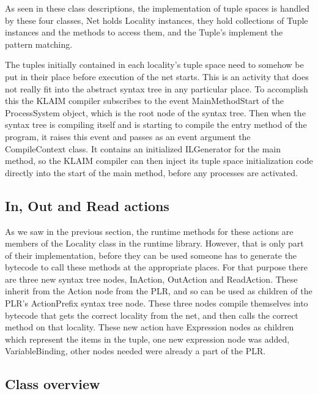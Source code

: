	As seen in these class descriptions, the implementation of tuple spaces is 
	handled by these four classes, \textsf{Net} holds \textsf{Locality} 
	instances, they hold collections of \textsf{Tuple} instances and the methods 
	to access them, and the \textsf{Tuple}'s implement the pattern matching.
	
	The tuples initially contained in each locality's tuple space need to 
	somehow be put in their place before execution of the net starts. This is an 
	activity that does not really fit into the abstract syntax tree in any 
	particular place. To accomplish this the KLAIM compiler subscribes to the 
	event \textsf{MainMethodStart} of the \textsf{ProcessSystem} object, which 
	is the root node of the syntax tree. Then when the syntax tree is compiling 
	itself and is starting to compile the entry method of the program, it raises 
	this event and passes as an event argument the \textsf{CompileContext} 
	class. It contains an initialized \textsf{ILGenerator} for the main method, 
	so the KLAIM compiler can then inject its tuple space initialization code 
	directly into the start of the main method, before any processes are 
	activated.
	
	\subsection{In, Out and Read actions}
	
	As we saw in the previous section, the runtime methods for these actions are 
	members of the \textsf{Locality} class in the runtime library. However, that 
	is only part of their implementation, before they can be used someone has to 
	generate the bytecode to call these methods at the appropriate places. For 
	that purpose there are three new syntax tree nodes, \textsf{InAction}, 
	\textsf{OutAction} and \textsf{ReadAction}. These inherit from the 
	\textsf{Action} node from the PLR, and so can be used as children of the 
	PLR's \textsf{ActionPrefix} syntax tree node. These three nodes compile 
	themselves into bytecode that gets the correct locality from the net, and 
	then calls the correct method on that locality. These new action have 
	\textsf{Expression} nodes as children which represent the items in the 
	tuple, one new expression node was added, \textsf{VariableBinding}, other 
	nodes needed were already a part of the PLR.
	
\subsection{Class overview}
	
